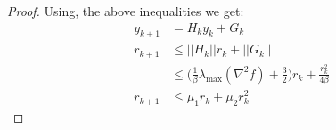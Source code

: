 \begin{proof}
Using, the above inequalities we get:
\begin{equation}
\begin{aligned}
y_{k+1} &= H_k y_k + G_k \\
r_{k+1} & \leq  ||H_k|| r_k + ||G_k|| \\
& \leq \big(\frac{1}{\beta} \lambda_{\max}(\nabla^2 f) + \frac{3}{2} \big)r_k + \frac{r_k^2}{4\beta} \\
r_{k+1} & \leq \mu_1 r_k + \mu_2 r_k^2
\end{aligned}
\end{equation}
\end{proof}
